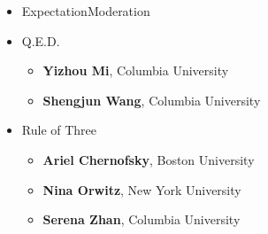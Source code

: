 
\begin{itemize}
\item ExpectationModeration
\item Q.E.D.
  \begin{itemize}
  \item \textbf{Yizhou Mi}, Columbia University
  \item \textbf{Shengjun Wang}, Columbia University
  \end{itemize}
\item Rule of Three
  \begin{itemize}
  \item \textbf{Ariel Chernofsky}, Boston University
  \item \textbf{Nina Orwitz}, New York University
  \item \textbf{Serena Zhan}, Columbia University 
  \end{itemize}
\end{itemize}





